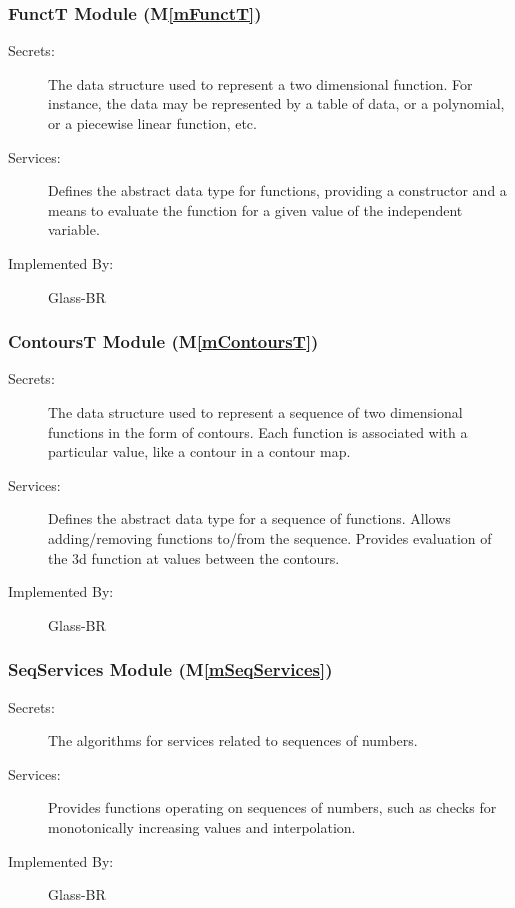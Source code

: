 \documentclass[12pt]{article}
\newcommand{\mref}[1]{M\ref{#1}}
\begin{document}
\subsubsection{FunctT Module (\mref{mFunctT})}

\begin{description}
\item[Secrets:] The data structure used to represent a two dimensional
  function.  For instance, the data may be represented by a table of data, or a
  polynomial, or a piecewise linear function, etc.
\item[Services:] Defines the abstract data type for functions, providing a
  constructor and a means to evaluate the function for a given value of the
  independent variable.
\item[Implemented By:] Glass-BR
\end{description}

\subsubsection{ContoursT Module (\mref{mContoursT})}

\begin{description}
\item[Secrets:] The data structure used to represent a
  sequence of two dimensional functions in the form of contours.  Each function
  is associated with a particular value, like a contour in a contour map.
\item[Services:] Defines the abstract data type for a sequence of functions.
  Allows adding/removing functions to/from the sequence.  Provides evaluation of
  the 3d function at values between the contours.
\item[Implemented By:] Glass-BR
\end{description}

\subsubsection{SeqServices Module (\mref{mSeqServices})}

\begin{description}
\item[Secrets:] The algorithms for services related to sequences of numbers.
\item[Services:] Provides functions operating on sequences of numbers, such as
  checks for monotonically increasing values and interpolation.
\item[Implemented By:] Glass-BR
\end{description}
\end{document}
